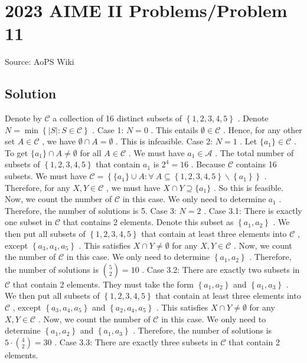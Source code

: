 \documentclass[12pt]{article}
\begin{document}
\section*{{2023 AIME II Problems/Problem 11}}
Source: AoPS Wiki

\subsection*{Solution}
Denote by $\mathcal C$ a collection of 16 distinct subsets of $\left\{ 1, 2, 3, 4, 5 \right\}$ .
Denote $N = \min \left\{ |S|: S \in \mathcal C \right\}$ . Case 1: $N = 0$ . This entails $\emptyset \in \mathcal C$ .
Hence, for any other set $A \in \mathcal C$ , we have $\emptyset \cap A = \emptyset$ . This is infeasible. Case 2: $N = 1$ . Let $\{a_1\} \in \mathcal C$ .
To get $\{a_1\} \cap A \neq \emptyset$ for all $A \in \mathcal C$ .
We must have $a_1 \in \mathcal A$ . The total number of subsets of $\left\{ 1, 2, 3, 4, 5 \right\}$ that contain $a_1$ is $2^4 = 16$ .
Because $\mathcal C$ contains 16 subsets.
We must have $\mathcal C = \left\{ \{a_1\} \cup A : \forall \ A \subseteq \left\{ 1, 2, 3, 4, 5 \right\} \backslash \left\{a_1 \right\} \right\}$ .
Therefore, for any $X, Y \in \mathcal C$ , we must have $X \cap Y \supseteq \{a_1\}$ .
So this is feasible. Now, we count the number of $\mathcal C$ in this case.
We only need to determine $a_1$ .
Therefore, the number of solutions is 5. Case 3: $N = 2$ . Case 3.1: There is exactly one subset in $\mathcal C$ that contains 2 elements. Denote this subset as $\left\{ a_1, a_2 \right\}$ .
We then put all subsets of $\left\{ 1, 2, 3, 4, 5 \right\}$ that contain at least three elements into $\mathcal C$ , except $\left\{ a_3, a_4, a_5 \right\}$ .
This satisfies $X \cap Y \neq \emptyset$ for any $X, Y \in \mathcal C$ . Now, we count the number of $\mathcal C$ in this case.
We only need to determine $\left\{ a_1, a_2 \right\}$ .
Therefore, the number of solutions is $\binom{5}{2} = 10$ . Case 3.2: There are exactly two subsets in $\mathcal C$ that contain 2 elements. They must take the form $\left\{ a_1, a_2 \right\}$ and $\left\{ a_1, a_3 \right\}$ . We then put all subsets of $\left\{ 1, 2, 3, 4, 5 \right\}$ that contain at least three elements into $\mathcal C$ , except $\left\{ a_3, a_4, a_5 \right\}$ and $\left\{ a_2, a_4, a_5 \right\}$ .
This satisfies $X \cap Y \neq \emptyset$ for any $X, Y \in \mathcal C$ . Now, we count the number of $\mathcal C$ in this case.
We only need to determine $\left\{ a_1, a_2 \right\}$ and $\left\{ a_1, a_3 \right\}$ .
Therefore, the number of solutions is $5 \cdot \binom{4}{2} = 30$ . Case 3.3: There are exactly three subsets in $\mathcal C$ that contain 2 elements.
\end{document}

